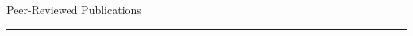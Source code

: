 \documentclass[10pt]{article}
\renewcommand{\section}[1]{\pagebreak[3]%
    \hyphenpenalty=10000%
    \vspace{1.3\baselineskip}%
    \phantomsection\addcontentsline{toc}{section}{#1}%
    \noindent\llap{\scshape\smash{\parbox[t]{\marginparwidth}{\raggedright #1}}}%
    \vspace{-\baselineskip}\par}
\begin{document}
{
    \hspace*{-\marginparsep minus \marginparwidth}%
    \begin{adjustwidth}{-1.25in}{}

        {\Large Peer-Reviewed Publications}\\
        {
            \hspace*{-\marginparsep}%
            \begin{minipage}[t]{1.25in+\textwidth+\marginparsep}%
                \rule{\columnwidth}{1pt}\\[-1.4\baselineskip]%
            \end{minipage}
        }\\[.5\baselineskip]


\end{adjustwidth}}
\end{document}
